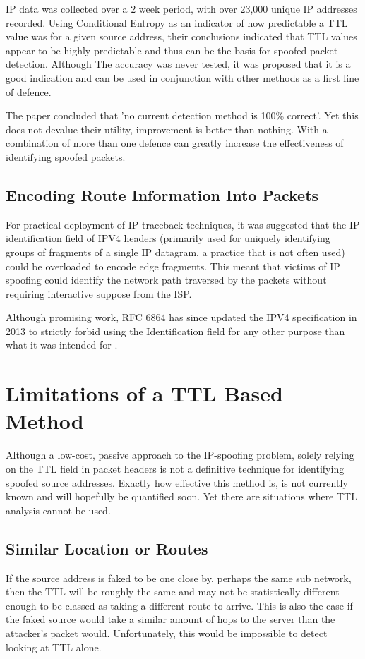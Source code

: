 \documentclass[twocolumn,10pt]{asme2ej}
\begin{document}
IP data was collected over a 2 week period, with over 23,000 unique IP addresses recorded. Using Conditional Entropy as an indicator of how predictable a TTL value was for a given source address, their conclusions indicated that TTL values appear to be highly predictable and thus can be the basis for spoofed packet detection. Although The accuracy was never tested, it was proposed that it is a good indication and can be used in conjunction with other methods as a first line of defence.

The paper concluded that 'no current detection method is 100\% correct'. Yet this does not devalue their utility, improvement is better than nothing. With a combination of more than one defence can greatly increase the effectiveness of identifying spoofed packets.

\subsection{Encoding Route Information Into Packets \cite{traceback}}
For practical deployment of IP traceback techniques, it was suggested that the IP identification field of IPV4 headers (primarily used for uniquely identifying groups of fragments of a single IP datagram, a practice that is not often used) could be overloaded to encode edge fragments. This meant that victims of IP spoofing could identify the network path traversed by the packets without requiring interactive suppose from the ISP.

Although promising work, RFC 6864 has since updated the IPV4 specification in 2013 to strictly forbid using the Identification field for any other purpose than what it was intended for \cite{rfc6864}.

\section{Limitations of a TTL Based Method}
Although a low-cost, passive approach to the IP-spoofing problem, solely relying on the TTL field in packet headers is not a definitive technique for identifying spoofed source addresses. Exactly how effective this method is, is not currently known and will hopefully be quantified soon. Yet there are situations where TTL analysis cannot be used.

\subsection{Similar Location or Routes}
If the source address is faked to be one close by, perhaps the same sub network, then the TTL will be roughly the same and may not be statistically different enough to be classed as taking a different route to arrive. This is also the case if the faked source would take a similar amount of hops to the server than the attacker's packet would. Unfortunately, this would be impossible to detect looking at TTL alone.
\end{document}
